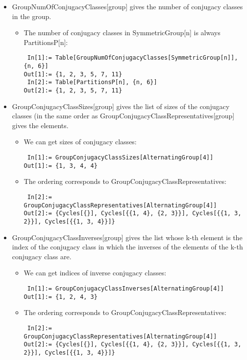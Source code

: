 \begin{itemize}
\item GroupNumOfConjugacyClasses[group] gives the number of conjugacy classes in the group.
\begin{itemize}
\item The number of conjugacy classes in SymmetricGroup[n] is always PartitionsP[n]:
\begin{lstlisting}
 In[1]:= Table[GroupNumOfConjugacyClasses[SymmetricGroup[n]], {n, 6}]
Out[1]:= {1, 2, 3, 5, 7, 11}
 In[2]:= Table[PartitionsP[n], {n, 6}]
Out[2]:= {1, 2, 3, 5, 7, 11}
\end{lstlisting}
\end{itemize}

\item GroupConjugacyClassSizes[group] gives the list of sizes of the conjugacy classes (in the same order as GroupConjugacyClassRepresentatives[group] gives the elements.
\begin{itemize}
\item We can get sizes of conjugacy classes:
\begin{lstlisting}
 In[1]:= GroupConjugacyClassSizes[AlternatingGroup[4]]
Out[1]:= {1, 3, 4, 4}
\end{lstlisting}
\item The ordering corresponds to GroupConjugacyClassRepresentatives:
\begin{lstlisting}
 In[2]:= GroupConjugacyClassRepresentatives[AlternatingGroup[4]]
Out[2]:= {Cycles[{}], Cycles[{{1, 4}, {2, 3}}], Cycles[{{1, 3, 2}}], Cycles[{{1, 3, 4}}]}
\end{lstlisting}
\end{itemize}

\item GroupConjugacyClassInverses[group] gives the list whose k-th element is the index of the conjugacy class in which the inverses of the elements of the k-th conjugacy class are.
\begin{itemize}
\item We can get indices of inverse conjugacy classes:
\begin{lstlisting}
 In[1]:= GroupConjugacyClassInverses[AlternatingGroup[4]]
Out[1]:= {1, 2, 4, 3}
\end{lstlisting}
\item The ordering corresponds to GroupConjugacyClassRepresentatives:
\begin{lstlisting}
 In[2]:= GroupConjugacyClassRepresentatives[AlternatingGroup[4]]
Out[2]:= {Cycles[{}], Cycles[{{1, 4}, {2, 3}}], Cycles[{{1, 3, 2}}], Cycles[{{1, 3, 4}}]}
\end{lstlisting}
\end{itemize}


\end{itemize}
